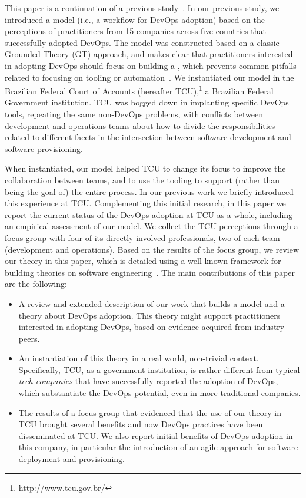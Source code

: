 This paper is a continuation of a previous study~\cite{Luz:2018:ESEM}.
In our previous study, we introduced a model (i.e., a workflow for DevOps adoption)
based on the perceptions of practitioners from
15 companies across five countries that successfully adopted DevOps. The model
was constructed based on a classic Grounded Theory (GT) approach,
and makes clear that practitioners interested in adopting DevOps should focus on building a
\cc, which prevents common pitfalls related to focusing on tooling or automation~\cite{Kromhout:2017:Queue}.
We instantiated our model in the Brazilian Federal Court of
Accounts (hereafter TCU),\footnote{http://www.tcu.gov.br/} a Brazilian Federal Government institution. TCU was
bogged down in implanting specific DevOps tools, repeating the same non-DevOps
problems, with conflicts between development and operations teams about how to
divide the responsibilities related to different facets in the intersection
between software development and software provisioning.

When instantiated,
our model helped TCU to change its focus to improve the collaboration between teams, and to use the tooling
to support (rather than being the goal of) the entire process.
In our previous work
we briefly introduced this experience at TCU.
Complementing this initial research, in this paper we report the current status
of the DevOps adoption at TCU as a whole, including an empirical assessment of our model.
We collect the TCU perceptions through a focus group with four of its directly
involved professionals, two of each team (development and operations). Based on
the results of the focus group, we review our theory in this paper, which is
detailed using a well-known framework for building theories on software engineering~\cite{sjoberg2008}.
The main contributions of this paper are the following:

\begin{itemize}
\item A review and extended description of our work that builds a model and
  a theory about DevOps adoption. This theory might support practitioners interested in adopting DevOps,
  based on evidence acquired from industry peers.

\item An instantiation of this theory in a real world, non-trivial context. Specifically, TCU,
  as a government institution, is rather different from typical \emph{tech companies} that have
  successfully reported the adoption of DevOps, which substantiate the DevOps potential, even in more traditional
  companies.

\item The results of a focus group that evidenced that the use of our theory in TCU brought several
  benefits and now DevOps practices have been disseminated at TCU. We also report initial benefits
  of DevOps adoption in this company, in particular the introduction of an agile approach for software
  deployment and provisioning.

\end{itemize}

